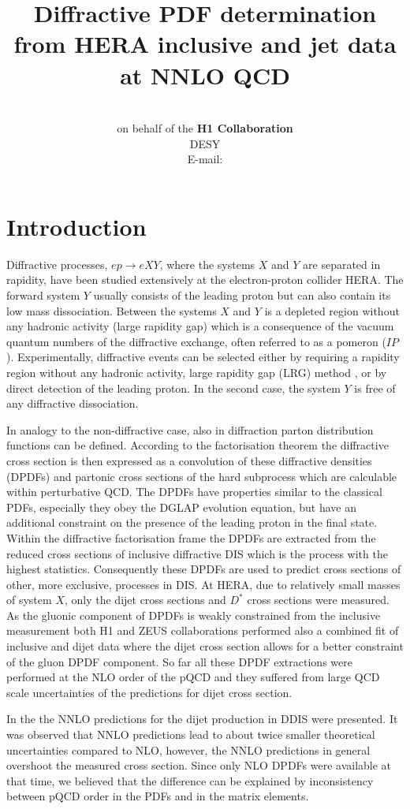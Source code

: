\documentclass{PoS}
\title{Diffractive PDF determination from HERA inclusive and jet data at NNLO QCD}
\author{\speaker{Radek \v{Z}leb\v{c}\'{i}k}\\ on behalf of the \textup{\textbf{H1 Collaboration}} \\
        DESY\\
        E-mail: \email{radek.zlebcik@desy.de}}
\newcommand{\IP}{I\!\!P}
\begin{document}
\section{Introduction}

Diffractive processes, $ep \to  eXY$, where the systems $X$ and $Y$ are separated in rapidity, have been studied extensively at the electron-proton collider HERA.
The forward system $Y$ usually consists of the leading proton but can also contain its low mass dissociation.
Between the systems $X$ and $Y$ is a depleted region without any hadronic activity (large rapidity gap) which is a consequence of the vacuum quantum numbers of the diffractive exchange, often referred to as a pomeron ($\IP$).
Experimentally, diffractive events can be selected either by requiring a rapidity region without any hadronic activity, large rapidity gap (LRG) method , or by direct detection of the leading proton.
In the second case, the system $Y$ is free of any diffractive dissociation.

In analogy to the non-diffractive case, also in diffraction parton distribution functions can be defined.
According to the factorisation theorem \cite{Collins:1997sr} the diffractive cross section is then expressed as a convolution of these diffractive densities (DPDFs) and partonic cross sections of the hard subprocess which are calculable within perturbative QCD.
The DPDFs have properties similar to the classical PDFs, especially they obey the DGLAP evolution equation, but have an additional constraint on the presence of the leading proton in the final state.
Within the diffractive factorisation frame the DPDFs are extracted from the reduced cross sections of inclusive diffractive DIS \cite{Aktas:2006hy} which is the process with the highest statistics.
Consequently these DPDFs are used to predict cross sections of other, more exclusive, processes in DIS.
At HERA, due to relatively small masses of system $X$, only the dijet cross sections and $D^{*}$ cross sections were measured.
As the gluonic component of DPDFs is weakly constrained from the inclusive measurement both H1 and ZEUS collaborations performed also a combined fit of inclusive and dijet data \cite{Aktas:2007bv,Chekanov:2009aa} where the dijet cross section allows for a better constraint of the gluon DPDF component.
So far all these DPDF extractions were performed at the NLO order of the pQCD and they suffered from large QCD scale uncertainties of the predictions for dijet cross section.

In the \cite{Britzger:2018zvv} the NNLO predictions for the dijet production in DDIS were presented.
It was observed that NNLO predictions lead to about twice smaller theoretical uncertainties compared to NLO, however, the NNLO predictions in general overshoot the measured cross section.
Since only NLO DPDFs were available at that time, we believed that the difference can be explained by inconsistency between pQCD order in the PDFs and in the matrix elements.
\end{document}
